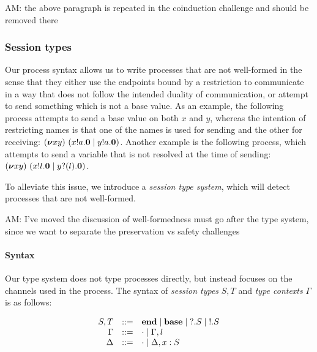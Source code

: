\begin{metanote}
  AM: the above paragraph is repeated in the coinduction challenge and should be removed there
\end{metanote}
\subsubsection{Session types}
Our process syntax allows us to write processes that are not well-formed in the sense that they either use the endpoints bound by a restriction to communicate in a way that does not follow the intended duality of communication, or attempt to send something which is not a base value.
As an example, the following process attempts to send a base value on both \( x \) and \( y\), whereas the intention of restricting names is that one of the names is used for sending and the other for receiving: \( (\bm{\nu} xy)~(x ! a . \bm{0} \mid y ! a . \bm{0}) \).
Another example is the following process, which attempts to send a variable that is not resolved at the time of sending: \( (\bm{\nu} xy)~(x ! l . \bm{0} \mid y ? (l) . \bm{0}) \).

To alleviate this issue, we introduce a \emph{session type system}, which will detect processes that are not well-formed.

\begin{metanote}
  AM: I've moved the discussion of well-formedness must go after the
  type system, since we want to separate the preservation vs
  safety challenges
\end{metanote}
\paragraph{Syntax}
Our type system does not type processes directly, but instead focuses on the channels used in the process.
The syntax of \emph{session types} \( S, T \) and \emph{type contexts} \( \Gamma \) is as follows:

\[
  \begin{array}{rcl}
  S,T & ::= & \mathbf{end} \mid \mathbf{base} \mid {?}.S \mid {!}.S \\
    \Gamma &::= & \cdot \mid \Gamma, l \\
                    \Delta &::= & \cdot \mid \Delta, x : S
     \end{array}
\]

